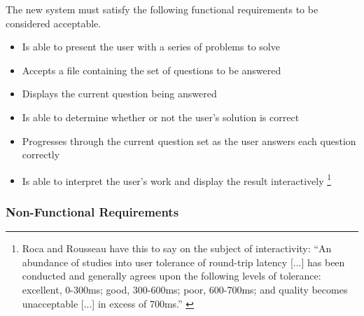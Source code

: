 \documentclass[12pt,twoside,notitlepage,xetex]{report}
\begin{document}
The new system must satisfy the following functional requirements to be considered acceptable.

\begin{itemize}
\item Is able to present the user with a series of problems to solve
\item Accepts a file containing the set of questions to be answered
\item Displays the current question being answered
\item Is able to determine whether or not the user's solution is correct
\item Progresses through the current question set as the user answers each question correctly
\item Is able to interpret the user's work and display the result interactively \footnote{Roca and Rousseau have this to say on the subject of interactivity: ``An abundance of studies into user tolerance of round-trip latency [...] has been conducted and generally agrees upon the following levels of tolerance: excellent, 0-300ms; good, 300-600ms; poor, 600-700ms; and quality becomes unacceptable [...] in excess of 700ms.'' \cite{Roca2004}}
\end{itemize}

\subsubsection{Non-Functional Requirements}
\end{document}
